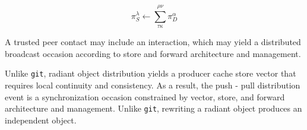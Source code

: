 \documentclass[12pt,twocolumn]{article}
\begin{document}
$$
 \pi^{\lambda}_S \leftarrow \sum^{\rho\nu}_{\tau\kappa} \pi^{\alpha}_{D}
$$

A trusted peer contact may include an interaction, which may yield a
distributed broadcast occasion according to store and forward
architecture and management.

Unlike {\tt git}, radiant object distribution yields a producer cache
store vector that requires local continuity and consistency.  As a
result, the push - pull distribution event is a synchronization
occasion constrained by vector, store, and forward architecture and
management.  Unlike {\tt git}, rewriting a radiant object produces an
independent object.

\break
\appendix



\end{document}
